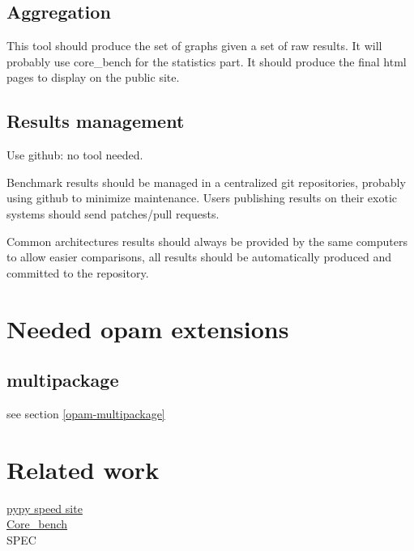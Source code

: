 \documentclass[11pt,a4paper]{article}
\begin{document}
\subsection{Aggregation}

This tool should produce the set of graphs given a set of raw
results. It will probably use core\_bench for the statistics part. It
should produce the final html pages to display on the public site.

\subsection{Results management}

Use github: no tool needed.

Benchmark results should be managed in a centralized git repositories,
probably using github to minimize maintenance. Users publishing
results on their exotic systems should send patches/pull requests.

Common architectures results should always be provided by the same
computers to allow easier comparisons, all results should be
automatically produced and committed to the repository.

\section{Needed opam extensions}

\subsection{multipackage}
see section \ref{opam-multipackage}

\subsection{}

\section{Related work}

\href{http://speed.pypy.org/}{pypy speed site}\\
\href{https://github.com/janestreet/core_bench}{Core\_bench}\\
SPEC\\
\end{document}
